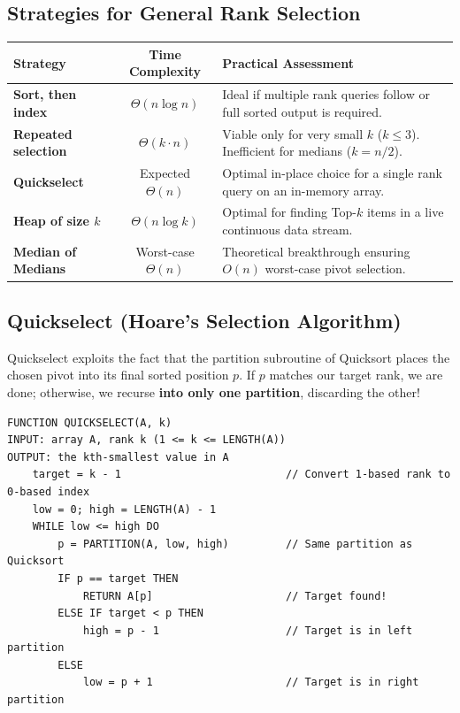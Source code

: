 \documentclass[11pt,a4paper]{article}
\begin{document}
\subsection{Strategies for General Rank Selection}
\begin{center}
\begin{tabularx}{\textwidth}{p{3.5cm} c p{7.5cm}}
\toprule
\textbf{Strategy} & \textbf{Time Complexity} & \textbf{Practical Assessment} \\
\midrule
\textbf{Sort, then index} & $\Theta(n \log n)$ & Ideal if multiple rank queries follow or full sorted output is required. \\
\textbf{Repeated selection} & $\Theta(k \cdot n)$ & Viable only for very small $k$ ($k \le 3$). Inefficient for medians ($k = n/2$). \\
\textbf{Quickselect} & Expected $\Theta(n)$ & Optimal in-place choice for a single rank query on an in-memory array. \\
\textbf{Heap of size $k$} & $\Theta(n \log k)$ & Optimal for finding Top-$k$ items in a live continuous data stream. \\
\textbf{Median of Medians} & Worst-case $\Theta(n)$ & Theoretical breakthrough ensuring $O(n)$ worst-case pivot selection. \\
\bottomrule
\end{tabularx}
\end{center}

\subsection{Quickselect (Hoare's Selection Algorithm)}
Quickselect exploits the fact that the partition subroutine of Quicksort places the chosen pivot into its final sorted position $p$. If $p$ matches our target rank, we are done; otherwise, we recurse \textbf{into only one partition}, discarding the other!

\begin{lstlisting}[style=pseudostyle]
FUNCTION QUICKSELECT(A, k)
INPUT: array A, rank k (1 <= k <= LENGTH(A))
OUTPUT: the kth-smallest value in A
    target = k - 1                          // Convert 1-based rank to 0-based index
    low = 0; high = LENGTH(A) - 1
    WHILE low <= high DO
        p = PARTITION(A, low, high)         // Same partition as Quicksort
        IF p == target THEN
            RETURN A[p]                     // Target found!
        ELSE IF target < p THEN
            high = p - 1                    // Target is in left partition
        ELSE
            low = p + 1                     // Target is in right partition
\end{lstlisting}
\end{document}
